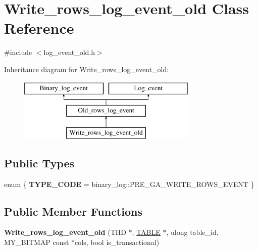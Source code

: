 \hypertarget{classWrite__rows__log__event__old}{}\section{Write\+\_\+rows\+\_\+log\+\_\+event\+\_\+old Class Reference}
\label{classWrite__rows__log__event__old}


{\ttfamily \#include $<$log\+\_\+event\+\_\+old.\+h$>$}

Inheritance diagram for Write\+\_\+rows\+\_\+log\+\_\+event\+\_\+old\+:\begin{figure}[H]
\begin{center}
\leavevmode
\includegraphics[height=3.000000cm]{classWrite__rows__log__event__old}
\end{center}
\end{figure}
\subsection*{Public Types}
\begin{DoxyCompactItemize}
\item 
\mbox{\label{classWrite__rows__log__event__old_a21052139673a078edbccc6e13351cbb3}} 
enum \{ {\bfseries T\+Y\+P\+E\+\_\+\+C\+O\+DE} = binary\+\_\+log\+:\+:P\+R\+E\+\_\+\+G\+A\+\_\+\+W\+R\+I\+T\+E\+\_\+\+R\+O\+W\+S\+\_\+\+E\+V\+E\+NT
 \}
\end{DoxyCompactItemize}
\subsection*{Public Member Functions}
\begin{DoxyCompactItemize}
\item 
\mbox{\label{classWrite__rows__log__event__old_a3bd8af252796799fc9f97556ae9369bb}} 
{\bfseries Write\+\_\+rows\+\_\+log\+\_\+event\+\_\+old} (T\+HD $\ast$, \mbox{\hyperlink{structTABLE}{T\+A\+B\+LE}} $\ast$, ulong table\+\_\+id, M\+Y\+\_\+\+B\+I\+T\+M\+AP const $\ast$cols, bool is\+\_\+transactional)
\end{DoxyCompactItemize}
